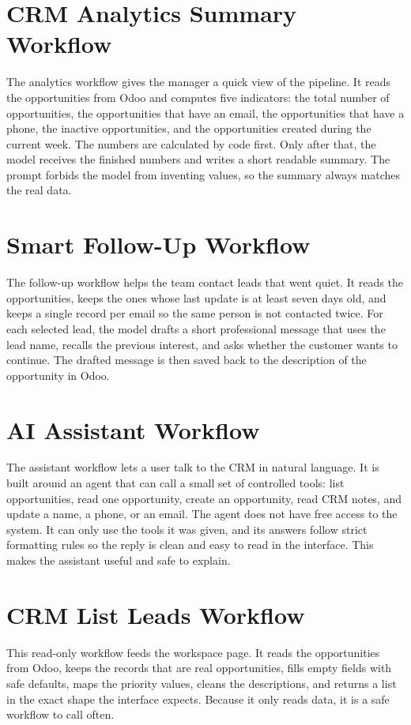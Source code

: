 \documentclass[12pt,a4paper,oneside]{report}
\begin{document}
\section{CRM Analytics Summary Workflow}\label{sumlbl:c3s3}
The analytics workflow gives the manager a quick view of the pipeline. It reads the opportunities from Odoo and computes five indicators: the total number of opportunities, the opportunities that have an email, the opportunities that have a phone, the inactive opportunities, and the opportunities created during the current week. The numbers are calculated by code first. Only after that, the model receives the finished numbers and writes a short readable summary. The prompt forbids the model from inventing values, so the summary always matches the real data.

\section{Smart Follow-Up Workflow}\label{sumlbl:c3s4}
The follow-up workflow helps the team contact leads that went quiet. It reads the opportunities, keeps the ones whose last update is at least seven days old, and keeps a single record per email so the same person is not contacted twice. For each selected lead, the model drafts a short professional message that uses the lead name, recalls the previous interest, and asks whether the customer wants to continue. The drafted message is then saved back to the description of the opportunity in Odoo.

\section{AI Assistant Workflow}\label{sumlbl:c3s5}
The assistant workflow lets a user talk to the CRM in natural language. It is built around an agent that can call a small set of controlled tools: list opportunities, read one opportunity, create an opportunity, read CRM notes, and update a name, a phone, or an email. The agent does not have free access to the system. It can only use the tools it was given, and its answers follow strict formatting rules so the reply is clean and easy to read in the interface. This makes the assistant useful and safe to explain.

\section{CRM List Leads Workflow}\label{sumlbl:c3s6}
This read-only workflow feeds the workspace page. It reads the opportunities from Odoo, keeps the records that are real opportunities, fills empty fields with safe defaults, maps the priority values, cleans the descriptions, and returns a list in the exact shape the interface expects. Because it only reads data, it is a safe workflow to call often.
\end{document}
